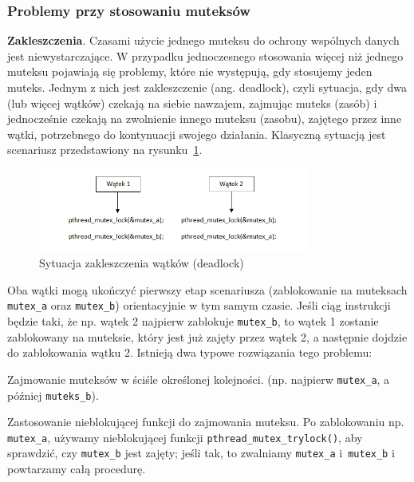 \subsubsection{Problemy przy stosowaniu muteksów}

\textbf{Zakleszczenia}. Czasami użycie jednego muteksu do ochrony wspólnych danych jest niewystarczające. W przypadku jednoczesnego stosowania więcej niż jednego muteksu pojawiają się problemy, które nie występują, gdy stosujemy jeden muteks. Jednym z nich jest zakleszczenie (ang. deadlock), czyli sytuacja, gdy dwa (lub więcej wątków) czekają na siebie nawzajem, zajmując muteks (zasób) i jednocześnie czekają na zwolnienie innego muteksu (zasobu), zajętego przez inne wątki, potrzebnego do kontynuacji swojego działania. Klasyczną sytuacją jest scenariusz przedstawiony na rysunku~\ref{fig:deadlock}. 

\begin{figure}[!h]
\centering
\includegraphics[width=0.8\textwidth]{img/deadlock}
\caption{Sytuacja zakleszczenia wątków (deadlock)}
\label{fig:deadlock}
\end{figure}

Oba wątki mogą ukończyć pierwszy etap scenariusza (zablokowanie na muteksach  \lstinline[style=MyCStyle]{mutex_a} oraz  \lstinline[style=MyCStyle]{mutex_b}) orientacyjnie w tym samym czasie. Jeśli ciąg instrukcji będzie taki, że np. wątek 2 najpierw zablokuje  \lstinline[style=MyCStyle]{mutex_b}, to wątek 1 zostanie zablokowany na muteksie, który jest już zajęty przez wątek 2, a następnie dojdzie do zablokowania wątku 2. Istnieją dwa typowe rozwiązania tego problemu:

\begin{myitemize}
\item Zajmowanie muteksów w ściśle określonej kolejności. (np. najpierw \lstinline[style=MyCStyle]{mutex_a}, a później \lstinline[style=MyCStyle]{muteks_b}).
\item Zastosowanie nieblokującej funkcji do zajmowania muteksu. Po zablokowaniu np. \lstinline[style=MyCStyle]{mutex_a}, używamy nieblokującej funkcji \lstinline[style=MyCStyle]{pthread_mutex_trylock()}, aby sprawdzić, czy \lstinline[style=MyCStyle]{mutex_b} jest zajęty; jeśli tak, to zwalniamy \lstinline[style=MyCStyle]{mutex_a} i~\lstinline[style=MyCStyle]{mutex_b} i powtarzamy całą procedurę.
\end{myitemize}

